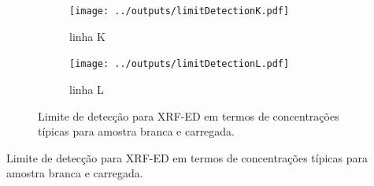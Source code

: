 \begin{figure}[H]
  \begin{subfigure}[b]{0.5\textwidth}
    \texttt{[image: ../outputs/limitDetectionK.pdf]}
    \caption{linha K}
  \end{subfigure}%
  \begin{subfigure}[b]{0.5\textwidth}
    \texttt{[image: ../outputs/limitDetectionL.pdf]}
    \caption{linha L}
  \end{subfigure}
  \caption{Limite de detecção para XRF-ED em termos de concentrações típicas 
           para amostra branca e carregada.
           \label{table:ld}}
\end{figure}

\newpage
\begin{table}[H]
  \centering
  
  \caption{Limite de detecção para XRF-ED em termos de concentrações típicas 
           para amostra branca e carregada. \label{table:LD}}
\end{table}
